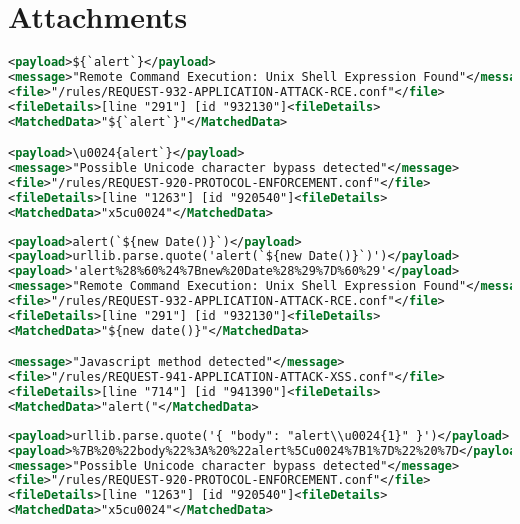 \section{Attachments}

%


\begin{lstlisting}[style=ruleStyle, language=XML, caption=unicode tests \$\{`alert`\}, label={lst:jsonunicodetests}]
<payload>${`alert`}</payload>
<message>"Remote Command Execution: Unix Shell Expression Found"</message>
<file>"/rules/REQUEST-932-APPLICATION-ATTACK-RCE.conf"</file>
<fileDetails>[line "291"] [id "932130"]<fileDetails>
<MatchedData>"${`alert`}"</MatchedData>

<payload>\u0024{alert`}</payload>
<message>"Possible Unicode character bypass detected"</message>
<file>"/rules/REQUEST-920-PROTOCOL-ENFORCEMENT.conf"</file>
<fileDetails>[line "1263"] [id "920540"]<fileDetails>
<MatchedData>"x5cu0024"</MatchedData>
\end{lstlisting}


\begin{lstlisting}[style=ruleStyle, language=XML, caption=url encoded example blocked, label={lst:urlencodedexampleblocked}]
<payload>alert(`${new Date()}`)</payload>
<payload>urllib.parse.quote('alert(`${new Date()}`)')</payload>
<payload>'alert%28%60%24%7Bnew%20Date%28%29%7D%60%29'</payload>
<message>"Remote Command Execution: Unix Shell Expression Found"</message>
<file>"/rules/REQUEST-932-APPLICATION-ATTACK-RCE.conf"</file>
<fileDetails>[line "291"] [id "932130"]<fileDetails>
<MatchedData>"${new date()}"</MatchedData>

<message>"Javascript method detected"</message>
<file>"/rules/REQUEST-941-APPLICATION-ATTACK-XSS.conf"</file>
<fileDetails>[line "714"] [id "941390"]<fileDetails>
<MatchedData>"alert("</MatchedData>
\end{lstlisting}


\begin{lstlisting}[style=ruleStyle, language=XML, caption=unicode escape in json with additional percent encoding, label={lst:jsonunicodeurlenctest}]
<payload>urllib.parse.quote('{ "body": "alert\\u0024{1}" }')</payload>
<payload>%7B%20%22body%22%3A%20%22alert%5Cu0024%7B1%7D%22%20%7D</payload>
<message>"Possible Unicode character bypass detected"</message>
<file>"/rules/REQUEST-920-PROTOCOL-ENFORCEMENT.conf"</file>
<fileDetails>[line "1263"] [id "920540"]<fileDetails>
<MatchedData>"x5cu0024"</MatchedData>
\end{lstlisting}


